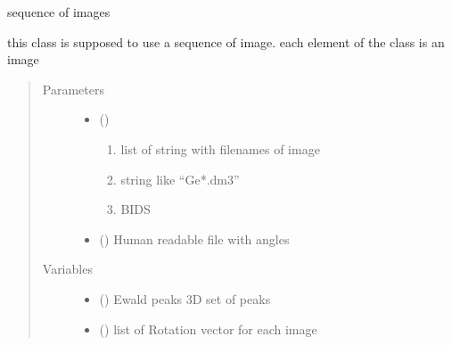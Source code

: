 \documentclass[letterpaper,10pt,english]{sphinxmanual}
\begin{document}

\begin{fulllineitems}
\label{\detokenize{index:TEMpcPlot.SeqIm}}
sequence of images

this class is supposed to use a sequence of image.
each element of the class is an image
\begin{quote}\begin{description}
\item[{Parameters}] \leavevmode\begin{itemize}
\item {} 
 () \textendash{} \begin{enumerate}
%
\item {} 
list of string with filenames of image

\item {} 
string like “Ge*.dm3”

\item {} 
BIDS

\end{enumerate}


\item {} 
 () \textendash{} Human readable file with angles

\end{itemize}

\item[{Variables}] \leavevmode\begin{itemize}
\item {} 
 ({\hyperref[\detokenize{index:TEMpcPlot.EwaldPeaks}]{}}) \textendash{} Ewald peaks 3D set of peaks

\item {} 
 () \textendash{} list of Rotation vector for each image


\end{itemize}
\end{description}
\end{quote}
\end{fulllineitems}
\end{document}
